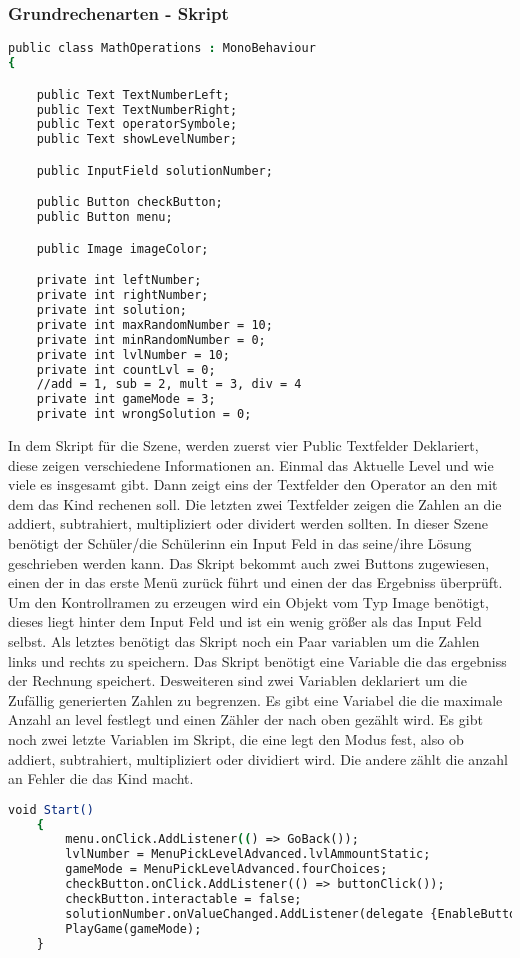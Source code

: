 \subsubsection{Grundrechenarten - Skript}
\begin{lstlisting}[language=csh, caption={MathOperations.cs Variablen Deklaration}]
public class MathOperations : MonoBehaviour
{

	public Text TextNumberLeft;
	public Text TextNumberRight;
	public Text operatorSymbole;
	public Text showLevelNumber;

	public InputField solutionNumber;

	public Button checkButton;
	public Button menu;

	public Image imageColor;

	private int leftNumber;
	private int rightNumber;
	private int solution;
	private int maxRandomNumber = 10;
	private int minRandomNumber = 0;
	private int lvlNumber = 10;
	private int countLvl = 0;
	//add = 1, sub = 2, mult = 3, div = 4
	private int gameMode = 3;
	private int wrongSolution = 0;
\end{lstlisting}
In dem Skript für die Szene, werden zuerst vier Public Textfelder Deklariert, diese zeigen verschiedene Informationen an. Einmal das Aktuelle Level und wie viele es insgesamt gibt. Dann zeigt eins der Textfelder den Operator an den mit dem das Kind rechenen soll. Die letzten zwei Textfelder zeigen die Zahlen an die addiert, subtrahiert, multipliziert oder dividert werden sollten. In dieser Szene benötigt der Schüler/die Schülerinn ein Input Feld in das seine/ihre Lösung geschrieben werden kann. Das Skript bekommt auch zwei Buttons zugewiesen, einen der in das erste Menü zurück führt und einen der das Ergebniss überprüft. Um den Kontrollramen zu erzeugen wird ein Objekt vom Typ Image benötigt, dieses liegt hinter dem Input Feld und ist ein wenig größer als das Input Feld selbst. Als letztes benötigt das Skript noch ein Paar variablen um die Zahlen links und rechts zu speichern. Das Skript benötigt eine Variable die das ergebniss der Rechnung speichert. Desweiteren sind zwei Variablen deklariert um die Zufällig generierten Zahlen zu begrenzen. Es gibt eine Variabel die die maximale Anzahl an level festlegt und einen Zähler der nach oben gezählt wird. Es gibt noch zwei letzte Variablen im Skript, die eine legt den Modus fest, also ob addiert, subtrahiert, multipliziert oder dividiert wird. Die andere zählt die anzahl an Fehler die das Kind macht.\\
\begin{lstlisting}[language=csh, caption={MathOperations.cs Start Funktion}]
	void Start()
	{
		menu.onClick.AddListener(() => GoBack());
		lvlNumber = MenuPickLevelAdvanced.lvlAmmountStatic;
		gameMode = MenuPickLevelAdvanced.fourChoices;
		checkButton.onClick.AddListener(() => buttonClick());
		checkButton.interactable = false;
		solutionNumber.onValueChanged.AddListener(delegate {EnableButton(); });
		PlayGame(gameMode);
	}
\end{lstlisting}

